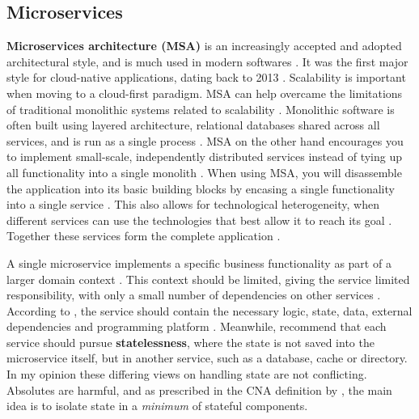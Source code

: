 \documentclass[utf8,english]{gradu3}
\begin{document}
\subsection{Microservices}

\textbf{Microservices architecture (MSA)} is an increasingly accepted and adopted
architectural style, and is much used in modern softwares
\parencite[10]{Vale2022}. It was the first major style for cloud-native
applications, dating back to 2013 \parencite[18]{Gannon2017}. Scalability is
important when moving to a cloud-first paradigm. MSA can help overcame the
limitations of traditional monolithic systems related to scalability
\parencite[10]{Vale2022}. Monolithic software is often built using layered
architecture, relational databases shared across all services, and is run as a
single process \parencite{Microsoft2022}. MSA on the other hand encourages you to
implement small-scale, independently distributed services instead of tying up
all functionality into a single monolith \parencite[1]{Li2021}. When using MSA,
you will disassemble the application into its basic building blocks by
encasing a single functionality into a single service
\parencite[18]{Gannon2017}. This also allows for technological heterogeneity,
when different services can use the technologies that best allow it to reach its
goal \parencite[18]{Li2021}. Together these services form the complete
application \parencite{Microsoft2022}.

A single microservice implements a specific business functionality as part of a
larger domain context \parencite{Microsoft2022}. This context should be limited,
giving the service limited responsibility, with only a small number of
dependencies on other services \parencite[18]{Gannon2017}. According to
\textcite{Microsoft2022}, the service should contain the necessary logic, state,
data, external dependencies and programming platform \parencite{Microsoft2022}.
Meanwhile, \textcite[18]{Gannon2017} recommend that each service should pursue
\textbf{statelessness}, where the state is not saved into the microservice itself, but in
another service, such as a database, cache or directory. In my opinion these
differing views on handling state are not conflicting. Absolutes are harmful,
and as prescribed in the CNA definition by \textcite[13]{Kratzke2017}, the main
idea is to isolate state in a \textit{minimum} of stateful components.
\end{document}
